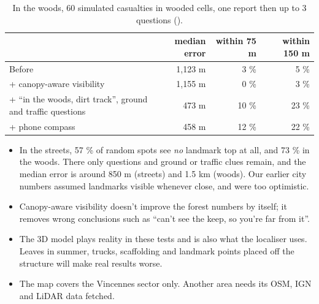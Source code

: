 \begin{table}[htbp]\centering\small
\caption{In the woods, 60 simulated casualties in wooded cells, one report then up to 3 questions
().}\label{tab:forest}
\begin{tabular}{lrrr}
\toprule
& median error & within 75 m & within 150 m\\
\midrule
Before & 1,123 m & 3 \% & 5 \%\\
+ canopy-aware visibility & 1,155 m & 0 \% & 3 \%\\
+ ``in the woods, dirt track'', ground and traffic questions & 473 m & 10 \% & 23 \%\\
+ phone compass & 458 m & 12 \% & 22 \%\\
\bottomrule
\end{tabular}
\end{table}

\begin{caveat}
\begin{itemize}
  \item In the streets, 57 \% of random spots see \emph{no} landmark top at all, and 73 \% in the woods. There only
        questions and ground or traffic clues remain, and the median error is around 850 m (streets) and 1.5 km
        (woods). Our earlier city numbers assumed landmarks visible whenever close, and were too optimistic.
  \item Canopy-aware visibility doesn't improve the forest numbers by itself; it removes wrong conclusions such as
        ``can't see the keep, so you're far from it''.
  \item The 3D model plays reality in these tests and is also what the localiser uses. Leaves in summer, trucks,
        scaffolding and landmark points placed off the structure will make real results worse.
  \item The map covers the Vincennes sector only. Another area needs its OSM, IGN and LiDAR data fetched.
\end{itemize}
\end{caveat}
